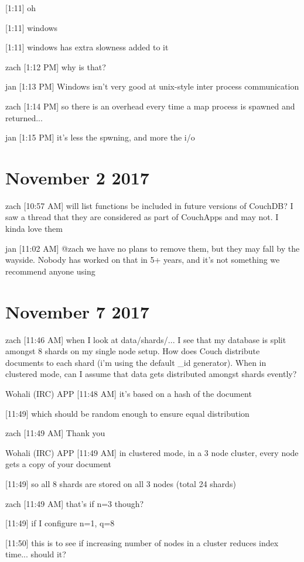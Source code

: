 [1:11]
oh

    [1:11]
windows

    [1:11]
windows has extra slowness added to it

zach [1:12 PM]
why is that?

jan [1:13 PM]
Windows isn’t very good at unix-style inter process communication

zach [1:14 PM]
so there is an overhead every time a map process is spawned and returned...

jan [1:15 PM]
it’s less the spwning, and more the i/o

\section{November 2 2017}
\label{slack-2-nov}
zach [10:57 AM]
will list functions be included in future versions of CouchDB? I saw a thread that they are considered as part of CouchApps and may not. I kinda love them

jan [11:02 AM]
@zach we have no plans to remove them, but they may fall by the wayside. Nobody has worked on that in 5+ years, and it’s not something we recommend anyone using

\section{November 7 2017}
\label{slack-7-nov}
zach [11:46 AM]
when I look at data/shards/... I see that my database is split amongst 8 shards on my single node setup. How does Couch distribute documents to each shard (i'm using the default \_id generator). When in clustered mode, can I assume that data gets distributed amongst shards evently?

Wohali (IRC) APP [11:48 AM]
it's based on a hash of the document

[11:49]
which should be random enough to ensure equal distribution

zach [11:49 AM]
Thank you

Wohali (IRC) APP [11:49 AM]
in clustered mode, in a 3 node cluster, every node gets a copy of your document

[11:49]
so all 8 shards are stored on all 3 nodes (total 24 shards)

zach [11:49 AM]
that's if n=3 though?

[11:49]
if I configure n=1, q=8

    [11:50]
this is to see if increasing number of nodes in a cluster reduces index time... should it?

